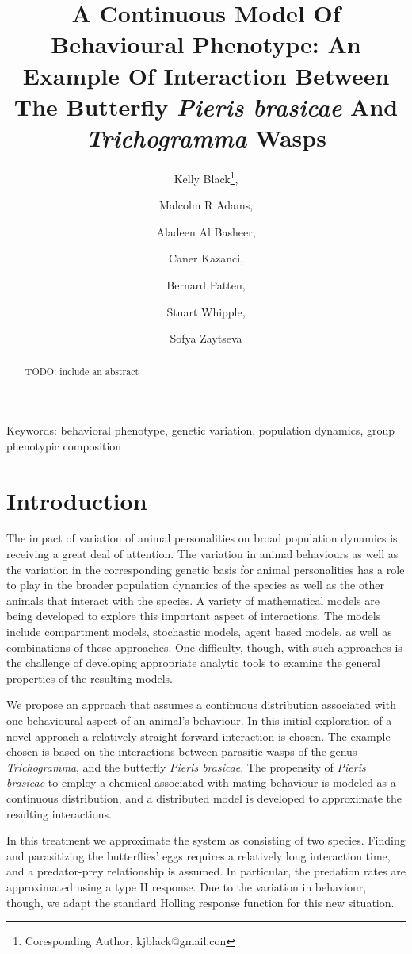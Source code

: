 \documentclass[12pt]{article}
\title{A Continuous Model Of Behavioural Phenotype: An Example Of
  Interaction Between The Butterfly \textit{Pieris brasicae} And
  \textit{Trichogramma} Wasps}
\author{Kelly Black\thanks{Coresponding Author, kjblack@gmail.con},
  \and Malcolm R Adams, \and Aladeen Al Basheer, \and Caner Kazanci,
  \and Bernard Patten, \and Stuart Whipple, \and Sofya Zaytseva}
\begin{document}
\maketitle

\begin{abstract}
  TODO: include an abstract
\end{abstract}

\noindent
Keywords: behavioral phenotype, genetic variation, population
dynamics,  group phenotypic composition

\section{Introduction}

The impact of variation of animal personalities on broad population
dynamics is receiving a great deal of
attention\cite{doi:10.1111/j.1461-0248.2010.01536.x}.  The variation
in animal behaviours as well as the variation in the corresponding
genetic basis for animal personalities has a role to play in the
broader population dynamics of the species as well as the other
animals that interact with the species. A variety of mathematical
models are being developed to explore this important aspect of
interactions. The models include compartment models, stochastic
models, agent based models, as well as combinations of these
approaches. One difficulty, though, with such approaches is the
challenge of developing appropriate analytic tools to examine the
general properties of the resulting models.

We propose an approach that assumes a continuous distribution
associated with one behavioural aspect of an animal's behaviour. In
this initial exploration of a novel approach a relatively
straight-forward interaction is chosen. The example chosen is based on
the interactions between parasitic wasps of the genus
\textit{Trichogramma}, and the butterfly \textit{Pieris
  brasicae}\cite{10.1093/beheco/arq007}.  The propensity of
\textit{Pieris brasicae} to employ a chemical associated with mating
behaviour is modeled as a continuous distribution, and a distributed
model is developed to approximate the resulting interactions.

In this treatment we approximate the system as consisting of two
species. Finding and parasitizing the butterflies' eggs requires a
relatively long interaction time, and a predator-prey relationship is
assumed. In particular, the predation rates are approximated using a
type II response. Due to the variation in behaviour, though, we adapt
the standard Holling response function for this new situation.
\end{document}
